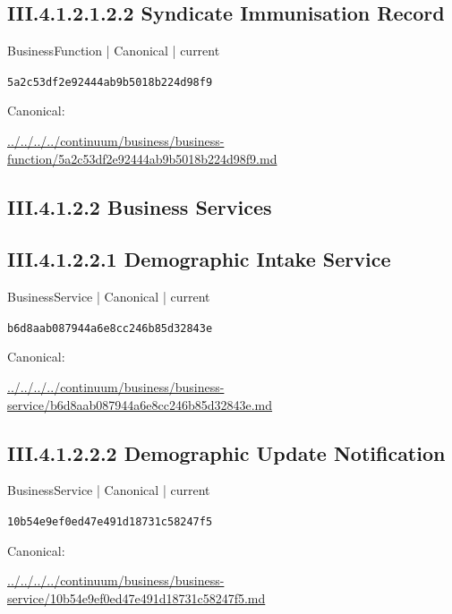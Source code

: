 \documentclass[10pt,a4paper]{article}
\begin{document}
\subsection*{III.4.1.2.1.2.2 Syndicate Immunisation Record}
\label{element-5a2c53df2e92444ab9b5018b224d98f9}
{\small BusinessFunction | Canonical | current}\par
\texttt{5a2c53df2e92444ab9b5018b224d98f9}\par
Canonical: \par
{\footnotesize\url{../../../../continuum/business/business-function/5a2c53df2e92444ab9b5018b224d98f9.md}}\par
\subsection*{III.4.1.2.2 Business Services}
\subsection*{III.4.1.2.2.1 Demographic Intake Service}
\label{element-b6d8aab087944a6e8cc246b85d32843e}
{\small BusinessService | Canonical | current}\par
\texttt{b6d8aab087944a6e8cc246b85d32843e}\par
Canonical: \par
{\footnotesize\url{../../../../continuum/business/business-service/b6d8aab087944a6e8cc246b85d32843e.md}}\par
\subsection*{III.4.1.2.2.2 Demographic Update Notification}
\label{element-10b54e9ef0ed47e491d18731c58247f5}
{\small BusinessService | Canonical | current}\par
\texttt{10b54e9ef0ed47e491d18731c58247f5}\par
Canonical: \par
{\footnotesize\url{../../../../continuum/business/business-service/10b54e9ef0ed47e491d18731c58247f5.md}}\par
\end{document}
